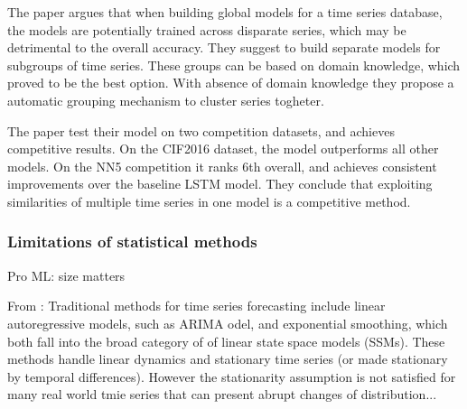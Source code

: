 The paper argues that when building global models for a time series database, the models are
potentially trained across disparate series, which may be detrimental to the overall accuracy.
They suggest to build separate models for subgroups of time series.
These groups can be based on domain knowledge, which proved to be the best option. With absence of 
domain knowledge they propose a automatic grouping mechanism to cluster series togheter.

The paper test their model on two competition datasets, and achieves competitive results.
On the CIF2016 dataset, the model outperforms all other models.
On the NN5 competition it ranks 6th overall, and achieves consistent improvements over the baseline LSTM model.
They conclude that exploiting similarities of multiple time series in one model
is a competitive method.



\subsubsection{Limitations of statistical methods}
Pro ML: size matters \cite{Cerqueira2019}

From \cite{Guen2019}:
Traditional methods for time series forecasting include linear autoregressive models, such as
ARIMA odel, and exponential smoothing, which both fall into the broad category of of linear 
state space models (SSMs). These methods handle linear
dynamics and stationary time series (or made stationary by temporal differences).
However the stationarity assumption is not satisfied for many real world tmie series that can present
abrupt changes of distribution...